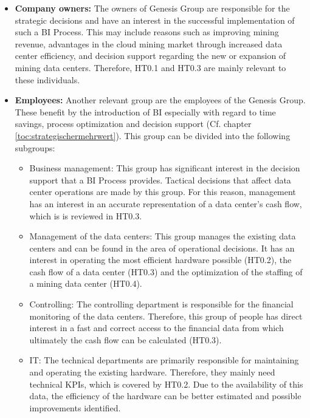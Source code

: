 \begin{itemize}
    \item \textbf{Company owners: }The owners of Genesis Group are responsible for the strategic decisions and
    have an interest in the successful implementation
    of such a \ac{BI} Process. This may include reasons such as improving mining revenue, advantages in the cloud mining market
    through increased data center efficiency, and decision support regarding the new or expansion of mining
    data centers. Therefore, \ac{HT0.1} and \ac{HT0.3} are mainly relevant to these individuals.
    \item \textbf{Employees: }Another relevant group are the employees of the Genesis Group. These benefit
    by the introduction of \ac{BI} especially with regard to time savings, process optimization and
    decision support (Cf. chapter \ref{toc:strategischermehrwert}). This group can be divided into the following subgroups:
    \begin{itemize}
        \item Business management: This group has significant interest in the decision support that a \ac{BI} Process
        provides. Tactical decisions that affect data center operations are made by this group.
        For this reason, management has an interest in an accurate representation of a data center's cash flow, which is
        is reviewed in \ac{HT0.3}.
        \item Management of the data centers: This group manages the existing data centers and can be found in the area of operational decisions.
        It has an interest in operating the most efficient hardware possible (\ac{HT0.2}),
        the cash flow of a data center (\ac{HT0.3}) and the optimization of the staffing of a mining data center
        (\ac{HT0.4}).
        \item Controlling: The controlling department is responsible for the financial monitoring of the data centers. Therefore, this
        group of people has direct interest in a fast and correct access to the financial data from which
        ultimately the cash flow can be calculated (\ac{HT0.3}).
        \item IT: The technical departments are primarily responsible for maintaining and operating the existing hardware.
        Therefore, they mainly need technical \acp{KPI}, which is covered by \ac{HT0.2}. Due to the availability
        of this data, the efficiency of the hardware can be better estimated and possible improvements identified.
    \end{itemize}

\end{itemize}
